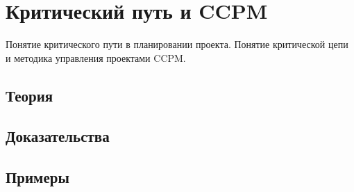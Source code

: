 
\section{Критический путь и CCPM}
\label{sec:2.6.05-critical-path-ccpm}

\begin{ticket}
Понятие критического пути в планировании проекта. Понятие критической цепи и методика управления проектами CCPM.
\end{ticket}

\subsection*{Теория}

\subsection*{Доказательства}

\subsection*{Примеры}
